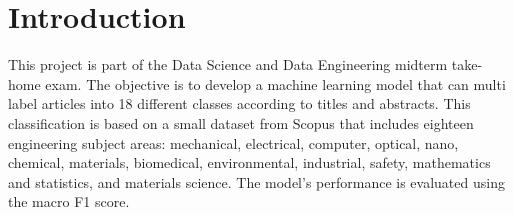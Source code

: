 \documentclass[../main.tex]{subfiles}
\begin{document}
\chapter{Introduction}
This project is part of the Data Science and Data Engineering midterm take-home exam. 
The objective is to develop a machine learning model that can multi label articles into 18 different classes 
according to titles and abstracts. 
This classification is based on a small dataset from Scopus that includes eighteen engineering subject areas: 
mechanical, electrical, computer, optical, nano, chemical, materials, biomedical, environmental, 
industrial, safety, mathematics and statistics, and materials science. 
The model's performance is evaluated using the macro F1 score.
\end{document}
